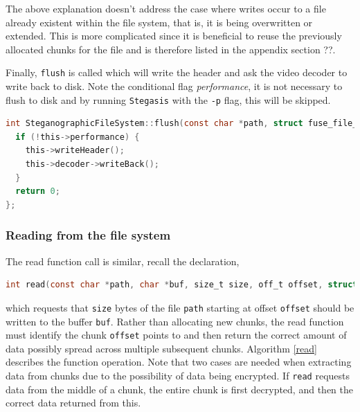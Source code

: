 \documentclass[paper=a4, fontsize=11pt,twoside]{scrartcl}    %
\numberwithin{table}{section}
\numberwithin{figure}{section}
\numberwithin{algorithm}{section}
\begin{document}
The above explanation doesn't address the case where writes occur to a file already existent within the file system, that is, it is being overwritten or extended. This is more complicated since it is beneficial to reuse the previously allocated chunks for the file and is therefore listed in the appendix section ??.

Finally, \texttt{flush} is called which will write the header and ask the video decoder to write back to disk. Note the conditional flag \textit{performance}, it is not necessary to flush to disk and by running \texttt{Stegasis} with the \texttt{-p} flag, this will be skipped.

\begin{lstlisting}[language=C, caption={\texttt{FUSE} flush implementation (\texttt{fs/stegfs.cc:537}).}, frame=single]
int SteganographicFileSystem::flush(const char *path, struct fuse_file_info *fi) {
  if (!this->performance) {
    this->writeHeader();
    this->decoder->writeBack();
  }
  return 0;
};
\end{lstlisting}


\subsubsection{Reading from the file system}

The read function call is similar, recall the declaration,

\begin{lstlisting}[language=C, caption={\texttt{FUSE} read operation.}, frame=single]
int read(const char *path, char *buf, size_t size, off_t offset, struct fuse_file_info *fi);
\end{lstlisting}

\noindent
which requests that \texttt{size} bytes of the file \texttt{path} starting at offset \texttt{offset} should be written to the buffer \texttt{buf}. Rather than allocating new chunks, the read function must identify the chunk \texttt{offset} points to and then return the correct amount of data possibly spread across multiple subsequent chunks. Algorithm \ref{read} describes the function operation. Note that two cases are needed when extracting data from chunks due to the possibility of data being encrypted. If \texttt{read} requests data from the middle of a chunk, the entire chunk is first decrypted, and then the correct data returned from this.
\end{document}
